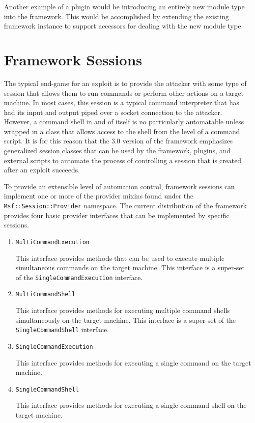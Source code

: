 \documentclass{report}
\begin{document}
\par
Another example of a plugin would be introducing an entirely new
module type into the framework.  This would be accomplished by
extending the existing framework instance to support accessors for
dealing with the new module type.

\chapter{Framework Sessions}
\label{framework-sessions}

\par
The typical end-game for an exploit is to provide the attacker with
some type of session that allows them to run commands or perform
other actions on a target machine.  In most cases, this session is a
typical command interpreter that has had its input and output piped
over a socket connection to the attacker.  However, a command shell
in and of itself is no particularly automatable unless wrapped in a
class that allows access to the shell from the level of a command
script.  It is for this reason that the 3.0 version of the framework
emphasizes generalized session classes that can be used by the
framework, plugins, and external scripts to automate the process of
controlling a session that is created after an exploit succeeds.

\par
To provide an extensible level of automation control, framework
sessions can implement one or more of the provider mixins found
under the \texttt{Msf::Session::Provider} namespace.  The current
distribution of the framework provides four basic provider
interfaces that can be implemented by specific sessions.

\begin{enumerate}
    \item \texttt{MultiCommandExecution}

This interface provides methods that can be used to execute
multiple simultaneous  commands on the target machine.  This
interface is a super-set of the \texttt{SingleCommandExecution}
interface.

    \item \texttt{MultiCommandShell}

This interface provides methods for executing multiple command
shells simultaneously on the target machine.  This interface is a
super-set of the \texttt{SingleCommandShell} interface.

    \item \texttt{SingleCommandExecution}

This interface provides methods for executing a single command on
the target machine.

    \item \texttt{SingleCommandShell}

This interface provides methods for executing a single command shell
on the target machine.

\end{enumerate}
\end{document}
